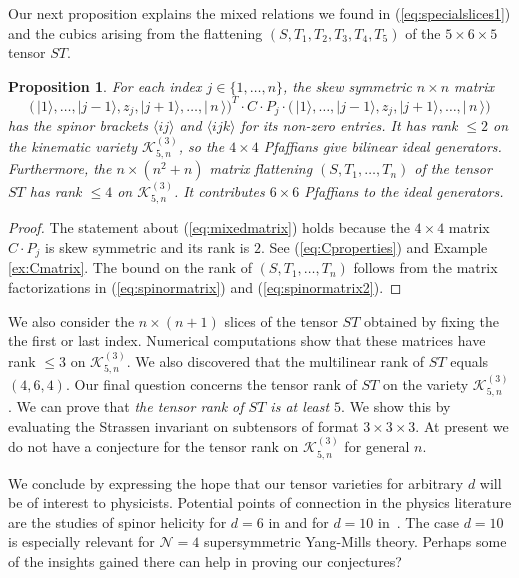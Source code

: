 \documentclass[english]{ourlematema}
\numberwithin{theorem}{section}
\newtheorem{proposition}[theorem]{Proposition}
\theoremstyle{definition}
\begin{document}
   Our next proposition explains the mixed relations we found
   in (\ref{eq:specialslices1}) and the cubics arising from the flattening $(S, T_1, T_2, T_3, T_4, T_5)$
   of the $5 \times 6 \times 5$ tensor $ST$.
   
   \begin{proposition}
For each index $j \in \{1,\ldots,n\}$, the skew symmetric $n \times n$ matrix
\begin{equation}
\label{eq:mixedmatrix}
\!\!    \bigl(\, |1\rangle, \ldots, | j\!-\!1 \rangle, z_j , | j\!+\!1 \rangle,  \ldots,       | \, n \,  \rangle
    \bigr)^T\! \! \cdot C \cdot P_j  \cdot\bigl( \,|1\rangle, \ldots,  | j\!-\!1 \rangle, z_j ,  | j\!+\!1 \rangle,   \ldots, | \, n \,  \rangle
    \bigr) 
\end{equation} 
has the spinor brackets $\langle ij \rangle$ and $\langle i j k \rangle$ for its
non-zero entries.
It has rank  $\leq 2$ on the kinematic variety $\mathcal{K}^{(3)}_{5,n}$,
so the $4 \times 4$ Pfaffians give bilinear ideal generators.
Furthermore, the $n \times (n^2 +n)$ matrix flattening
$(S,T_1,\dots,T_n)$ of the tensor $ST$ has rank $\leq 4$ on $\mathcal{K}^{(3)}_{5,n}$.
It contributes $6 \times 6$ Pfaffians to the ideal generators.
   \end{proposition}

\begin{proof}
The statement about (\ref{eq:mixedmatrix}) holds because the
$4 \times 4$ matrix $C \cdot P_j$ is skew symmetric and its rank is $2$.
See (\ref{eq:Cproperties}) and Example \ref{ex:Cmatrix}.
The bound on the rank of $(S,T_1,\dots,T_n)$
follows from  the matrix factorizations in
(\ref{eq:spinormatrix})  and (\ref{eq:spinormatrix2}).
\end{proof}   

We also consider the $n \times (n+1)$ slices of the tensor $ST$ 
obtained by fixing the the first or last index. Numerical
computations show that these matrices have rank $\leq 3$ on $\mathcal{K}^{(3)}_{5,n}$. 
We also discovered that the multilinear rank of $ST $ equals $(4,6,4)$.
Our final question concerns the tensor rank of $ST$
on the variety $\mathcal{K}^{(3)}_{5,n}$.
We can prove that 
 {\em the tensor rank of $ST$  is at least $5$}.
We show this by evaluating the Strassen invariant \cite[Example 9.21]{MS}
on subtensors of format $3 \times 3 \times 3$.
At present we do not have a conjecture for the tensor rank on
$\mathcal{K}^{(3)}_{5,n}$ for general $n$.


\smallskip 

We conclude  by expressing the hope that our tensor varieties for arbitrary $d$ 
will be of interest to physicists.  Potential points of connection in the
physics literature are the studies of spinor helicity for $d=6 $ in \cite{CC} and for
 $d=10$ in~\cite{CHC}.   The case $d=10$ is especially relevant for $ \mathcal{N}=4 $ 
 supersymmetric Yang-Mills theory. Perhaps some of the insights gained there can help
 in proving our conjectures?
\end{document}
